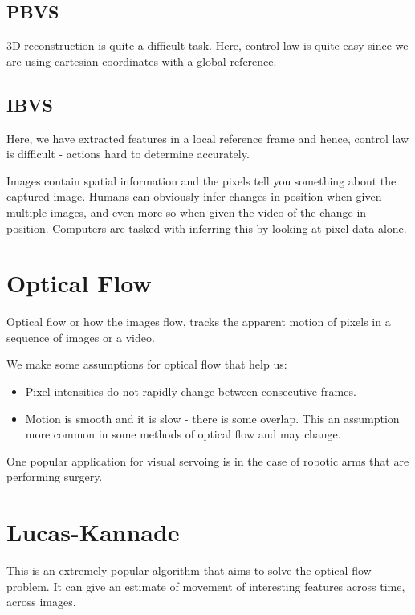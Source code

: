 \subsection{PBVS}

3D reconstruction is quite a difficult task. Here, control law is quite easy since we are using cartesian coordinates with a global reference. 

\subsection{IBVS}

Here, we have extracted features in a local reference frame and hence, control law is difficult - actions hard to determine accurately.

Images contain spatial information and the pixels tell you something about the captured image. Humans can obviously infer changes in position when given multiple images, and even more so when given the video of the change in position. Computers are tasked with inferring this by looking at pixel data alone. 

\section{Optical Flow}

Optical flow or how the images flow, tracks the apparent motion of pixels in a sequence of images or a video. 

We make some assumptions for optical flow that help us:

\begin{itemize}
    \item Pixel intensities do not rapidly change between consecutive frames. 
    \item Motion is smooth and it is slow - there is some overlap. This an assumption more common in some methods of optical flow and may change.
\end{itemize}

One popular application for visual servoing is in the case of robotic arms that are performing surgery.

\section{Lucas-Kannade}

This is an extremely popular algorithm that aims to solve the optical flow problem. It can give an estimate of movement of interesting features across time, across images.

